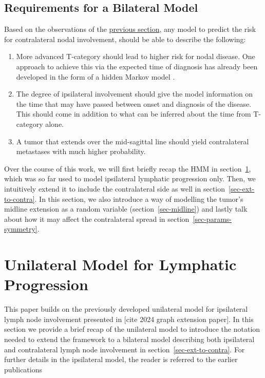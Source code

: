 \documentclass[
  sn-mathphys-num,
]{sn-jnl}
\providecommand{\tightlist}{%
  \setlength{\itemsep}{0pt}\setlength{\parskip}{0pt}}\usepackage{longtable,booktabs,array}
\begin{document}
\subsection{Requirements for a Bilateral Model}\label{sec-requirements}

Based on the observations of the \hyperref[sec-data-strat]{previous
section}, any model to predict the risk for contralateral nodal
involvement, should be able to describe the following:

\begin{enumerate}
\def\labelenumi{\arabic{enumi}.}
\tightlist
\item
  More advanced T-category should lead to higher risk for nodal disease.
  One approach to achieve this via the expected time of diagnosis has
  already been developed in the form of a hidden Markov model
  \citep{ludwig_hidden_2021}.
\item
  The degree of ipsilateral involvement should give the model
  information on the time that may have passed between onset and
  diagnosis of the disease. This should come in addition to what can be
  inferred about the time from T-category alone.
\item
  A tumor that extends over the mid-sagittal line should yield
  contralateral metastases with much higher probability.
\end{enumerate}

Over the course of this work, we will first briefly recap the HMM in
section~\ref{sec-unilateral}, which was so far used to model ipsilateral
lymphatic progression only. Then, we intuitively extend it to include
the contralateral side as well in section~\ref{sec-ext-to-contra}. In
this section, we also introduce a way of modelling the tumor's midline
extension as a random variable (section~\ref{sec-midline}) and lastly
talk about how it may affect the contralateral spread in
section~\ref{sec-params-symmetry}.

\section{Unilateral Model for Lymphatic
Progression}\label{sec-unilateral}

This paper builds on the previously developed unilateral model for
ipsilateral lymph node involvement presented in {[}cite 2024 graph
extension paper{]}. In this section we provide a brief recap of the
unilateral model to introduce the notation needed to extend the
framework to a bilateral model describing both ipsilateral and
contralateral lymph node involvement in section~\ref{sec-ext-to-contra}.
For further details in the ipsilateral model, the reader is referred to
the earlier publications \citep[cite 2024 graph extension
paper]{ludwig_hidden_2021}
\end{document}
